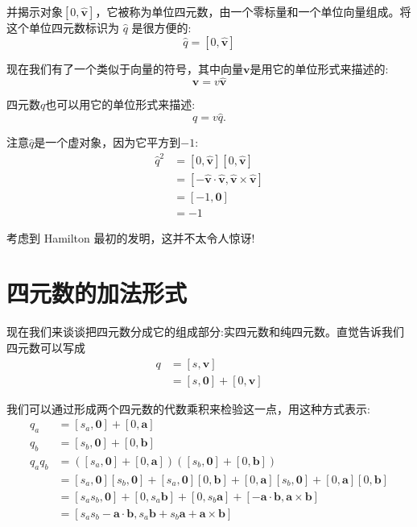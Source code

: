 并揭示对象$[0,\hat{\mathbf{v}}]$，它被称为单位四元数，由一个零标量和一个单位向量组成。将这个单位四元数标识为 $\hat{q}$ 是很方便的:
$$
\hat{q}=[0, \hat{\mathbf{v}}]
$$

现在我们有了一个类似于向量的符号，其中向量$\mathbf{v}$是用它的单位形式来描述的:
$$
\mathbf{v}=v \hat{\mathbf{v}}
$$

四元数$q$也可以用它的单位形式来描述:
$$
q=v \hat{q} .
$$

注意$\hat{q}$是一个虚对象，因为它平方到$-1$:
$$
\begin{aligned}
\hat{q}^{2} & =[0, \hat{\mathbf{v}}][0, \hat{\mathbf{v}}] \\
& =[-\hat{\mathbf{v}} \cdot \hat{\mathbf{v}}, \hat{\mathbf{v}} \times \hat{\mathbf{v}}] \\
& =[-1, \mathbf{0}] \\
& =-1
\end{aligned}
$$

考虑到 Hamilton 最初的发明，这并不太令人惊讶!

\section{四元数的加法形式}
现在我们来谈谈把四元数分成它的组成部分:实四元数和纯四元数。直觉告诉我们四元数可以写成
$$
\begin{aligned}
q & =[s, \mathbf{v}] \\
& =[s, \mathbf{0}]+[0, \mathbf{v}]
\end{aligned}
$$

我们可以通过形成两个四元数的代数乘积来检验这一点，用这种方式表示:
$$
\begin{aligned}
q_{a} & =\left[s_{a}, \mathbf{0}\right]+[0, \mathbf{a}] \\
q_{b} & =\left[s_{b}, \mathbf{0}\right]+[0, \mathbf{b}] \\
q_{a} q_{b} & =\left(\left[s_{a}, \mathbf{0}\right]+[0, \mathbf{a}]\right)\left(\left[s_{b}, \mathbf{0}\right]+[0, \mathbf{b}]\right) \\
& =\left[s_{a}, \mathbf{0}\right]\left[s_{b}, \mathbf{0}\right]+\left[s_{a}, \mathbf{0}\right][0, \mathbf{b}]+[0, \mathbf{a}]\left[s_{b}, \mathbf{0}\right]+[0, \mathbf{a}][0, \mathbf{b}] \\
& =\left[s_{a} s_{b}, \mathbf{0}\right]+\left[0, s_{a} \mathbf{b}\right]+\left[0, s_{b} \mathbf{a}\right]+[-\mathbf{a} \cdot \mathbf{b}, \mathbf{a} \times \mathbf{b}] \\
& =\left[s_{a} s_{b}-\mathbf{a} \cdot \mathbf{b}, s_{a} \mathbf{b}+s_{b} \mathbf{a}+\mathbf{a} \times \mathbf{b}\right]
\end{aligned}
$$

